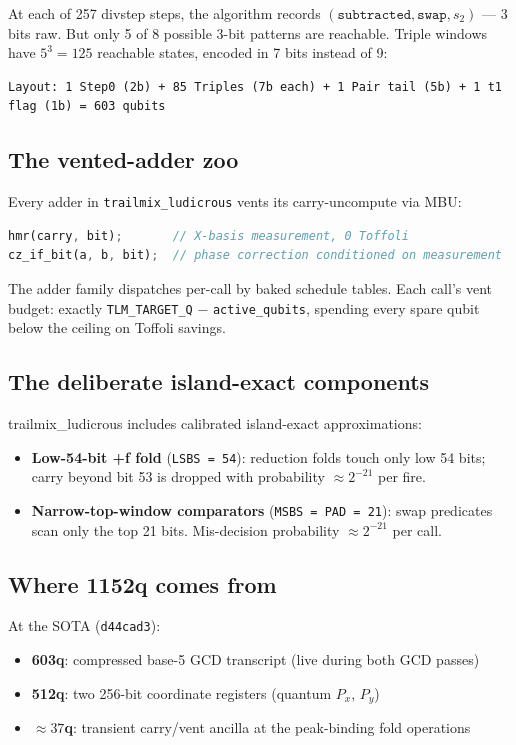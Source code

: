 \documentclass[11pt,a4paper]{article}
\begin{document}
At each of 257 divstep steps, the algorithm records $(\texttt{subtracted}, \texttt{swap}, s_2)$ ---
3 bits raw. But only 5 of 8 possible 3-bit patterns are reachable. Triple windows have $5^3 = 125$
reachable states, encoded in 7 bits instead of 9:
\begin{lstlisting}
Layout: 1 Step0 (2b) + 85 Triples (7b each) + 1 Pair tail (5b) + 1 t1 flag (1b) = 603 qubits
\end{lstlisting}

\subsection{The vented-adder zoo}

Every adder in \texttt{trailmix\_ludicrous} vents its carry-uncompute via MBU:
\begin{lstlisting}[language=Rust]
hmr(carry, bit);       // X-basis measurement, 0 Toffoli
cz_if_bit(a, b, bit);  // phase correction conditioned on measurement
\end{lstlisting}

The adder family dispatches per-call by baked schedule tables. Each call's vent budget: exactly
\texttt{TLM\_TARGET\_Q} $-$ \texttt{active\_qubits}, spending every spare qubit below the ceiling
on Toffoli savings.

\subsection{The deliberate island-exact components}

trailmix\_ludicrous includes calibrated island-exact approximations:
\begin{itemize}
  \item \textbf{Low-54-bit +f fold} (\texttt{LSBS = 54}): reduction folds touch only low 54 bits;
    carry beyond bit 53 is dropped with probability $\approx 2^{-21}$ per fire.
  \item \textbf{Narrow-top-window comparators} (\texttt{MSBS = PAD = 21}): swap predicates scan
    only the top 21 bits. Mis-decision probability $\approx 2^{-21}$ per call.
\end{itemize}

\subsection{Where 1152q comes from}

At the SOTA (\texttt{d44cad3}):
\begin{itemize}
  \item \textbf{603q}: compressed base-5 GCD transcript (live during both GCD passes)
  \item \textbf{512q}: two 256-bit coordinate registers (quantum $P_x$, $P_y$)
  \item \textbf{$\approx37$q}: transient carry/vent ancilla at the peak-binding fold operations
\end{itemize}
\end{document}
